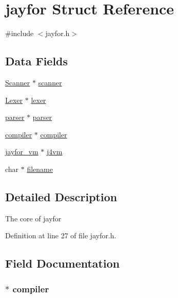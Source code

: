 \hypertarget{structjayfor}{\section{jayfor Struct Reference}
\label{structjayfor}
}


{\ttfamily \#include $<$jayfor.\+h$>$}

\subsection*{Data Fields}
\begin{DoxyCompactItemize}
\item 
\hyperlink{struct_scanner}{Scanner} $\ast$ \hyperlink{structjayfor_a802fe0f3060d87eba0e91c8c48046e76}{scanner}
\item 
\hyperlink{struct_lexer}{Lexer} $\ast$ \hyperlink{structjayfor_af49cfd254ef2d555a0cc3ddcf0d8153d}{lexer}
\item 
\hyperlink{structparser}{parser} $\ast$ \hyperlink{structjayfor_a8b50a631b24993a9524758c8e8842c6b}{parser}
\item 
\hyperlink{structcompiler}{compiler} $\ast$ \hyperlink{structjayfor_ac58bfda4a2306a5ae258ea250767cd54}{compiler}
\item 
\hyperlink{structjayfor__vm}{jayfor\+\_\+vm} $\ast$ \hyperlink{structjayfor_ac3106705d25b5b4851814aef6c7eafeb}{j4vm}
\item 
char $\ast$ \hyperlink{structjayfor_aeac90097f29f7529968697163cea5c18}{filename}
\end{DoxyCompactItemize}


\subsection{Detailed Description}
The core of jayfor 

Definition at line 27 of file jayfor.\+h.



\subsection{Field Documentation}
\hypertarget{structjayfor_ac58bfda4a2306a5ae258ea250767cd54}{
\subsubsection[{compiler}]{$\ast$ {\bf compiler}}}\label{structjayfor_ac58bfda4a2306a5ae258ea250767cd54}


